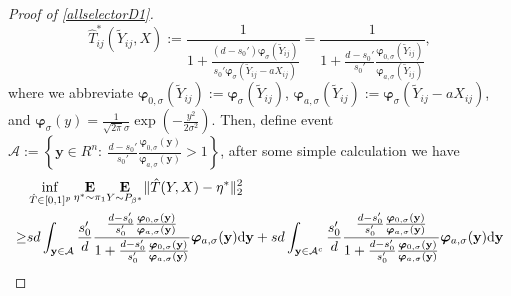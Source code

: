 \documentclass[12pt]{article}
\newtheorem{proof}{Proof}
\begin{document}
\begin{appendix}
\begin{proof}[Proof of \eqref{allselectorD1}]
\begin{equation*}
\hat T_{ij}^{*}(\tilde Y_{ij},X) 
:= \frac{1}{1+ \frac{(d-s_0')\boldsymbol \varphi_{\sigma} ( \tilde Y_{ij})  }
    {s_0' \boldsymbol \varphi_{\sigma} (\tilde Y_{ij}-aX_{ij} ) } }
=\frac{1}{1+ \frac{d-s_0'}{s_0'}
   \frac{\boldsymbol \varphi_{0,\sigma}(\tilde Y_{ij})}{\boldsymbol \varphi_{a,\sigma}(\tilde Y_{ij}) } },
\end{equation*}
where we abbreviate $\boldsymbol \varphi_{0,\sigma}({\tilde Y_{ij}}):= \boldsymbol \varphi_{\sigma} ( \tilde Y_{ij})$, $\boldsymbol \varphi_{a,\sigma} (\tilde Y_{ij} ):= \boldsymbol \varphi_{\sigma} (\tilde Y_{ij}-aX_{ij} )$, and $\boldsymbol \varphi_{ \sigma}(y) = \frac{1}{\sqrt{2\pi}\sigma} \exp \left( - \frac{y^2}{2\sigma^2} \right)$.
Then, define event $\mathcal A := \left\{\mathbf y \in R^n : ~\frac{d-s_0'}{s_0'} \frac{\boldsymbol \varphi_{0,\sigma}(\mathbf y)}{\boldsymbol \varphi_{a,\sigma}(\mathbf y) } >1 \right\}$, after some simple calculation we have 
\begin{equation}\label{D1T}
\begin{aligned}
&\inf_{\hat T\in[0,1]^p}\underset{\eta^* \sim \pi_1}{\mathbf E} 
   \underset{Y \sim P_{\beta^*} }{\mathbf E} \|\hat T(Y,X) - \eta^* \|_2^2 \\
\ge& sd\int_{{\bf y}\in \mathcal A} \frac{s_0'}{d} \frac{\frac{d-s_0'}{s_0'} \frac{\boldsymbol\varphi_{0,\sigma}({\bf y})}{\boldsymbol \varphi_{a,\sigma}({\bf y})}}
   {1+\frac{d-s_0'}{s_0'} \frac{ \boldsymbol \varphi_{0,\sigma}({\bf y})}{\boldsymbol \varphi_{a,\sigma}({\bf y})}}
   \boldsymbol \varphi_{a,\sigma}({\bf y}) \mathrm d {\bf y}
    + sd\int_{{\bf y}\in \mathcal A^c} \frac{s_0'}d \frac{\frac{d-s_0'}{s_0'} \frac{\boldsymbol\varphi_{0,\sigma}({\bf y})}{\boldsymbol \varphi_{a,\sigma}({\bf y})}}
   {1+\frac{d-s_0'}{s_0'} \frac{ \boldsymbol\varphi_{0,\sigma}({\bf y})}{\boldsymbol \varphi_{a,\sigma}({\bf y})}}
   \boldsymbol \varphi_{a,\sigma}({\bf y}) \mathrm d {\bf y}\\

\end{aligned}
\end{equation}
\end{proof}
\end{appendix}
\end{document}
